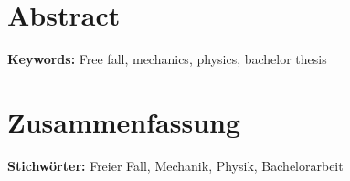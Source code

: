 
\section*{Abstract}

\blindtext

\medskip
\noindent \textbf{Keywords:} Free fall, mechanics, physics, bachelor thesis

\section*{Zusammenfassung}

\blindtext

\medskip
\noindent \textbf{Stichwörter:} Freier Fall, Mechanik, Physik, Bachelorarbeit
